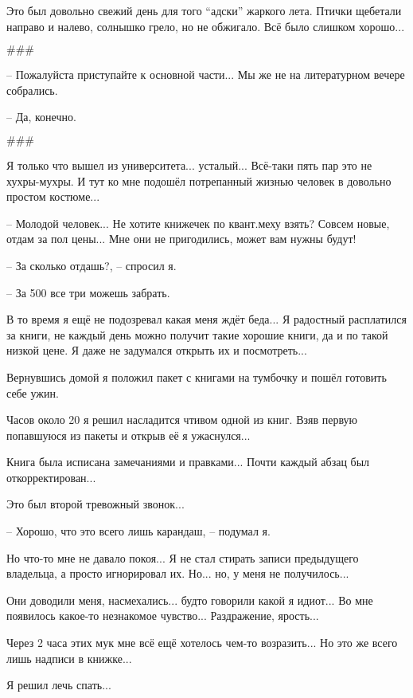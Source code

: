 Это был довольно свежий день для того ``адски'' жаркого лета. Птички щебетали направо и налево, солнышко грело, но не обжигало.
Всё было слишком хорошо...

\begin{center}\( \#\#\# \)\end{center}

-- Пожалуйста приступайте к основной части... Мы же не на литературном вечере собрались.

-- Да, конечно.

\begin{center}\( \#\#\# \)\end{center}

Я только что вышел из университета... усталый... Всё-таки пять пар это не хухры-мухры.
И тут ко мне подошёл потрепанный жизнью человек в довольно простом костюме...

-- Молодой человек... Не хотите книжечек по квант.меху взять? Совсем новые, отдам за пол цены...
Мне они не пригодились, может вам нужны будут!

-- За сколько отдашь?, -- спросил я.

-- За 500 все три можешь забрать.

В то время я ещё не подозревал какая меня ждёт беда... Я радостный расплатился за книги, не каждый день можно получит такие хорошие книги, да и по такой низкой цене. Я даже не задумался открыть их и посмотреть...

Вернувшись домой я положил пакет с книгами на тумбочку и пошёл готовить себе ужин.

Часов около 20 я решил насладится чтивом одной из книг. Взяв первую попавшуюся из пакеты и открыв её я ужаснулся...

Книга была исписана замечаниями и правками... Почти каждый абзац был откорректирован...

Это был второй тревожный звонок...

-- Хорошо, что это всего лишь карандаш, -- подумал я.

Но что-то мне не давало покоя... Я не стал стирать записи предыдущего владельца, а просто игнорировал их.
Но... но, у меня не получилось...

Они доводили меня, насмехались... будто говорили какой я идиот... Во мне появилось какое-то незнакомое чувство...
Раздражение, ярость...

Через 2 часа этих мук мне всё ещё хотелось чем-то возразить... Но это же всего лишь надписи в книжке...

Я решил лечь спать...

